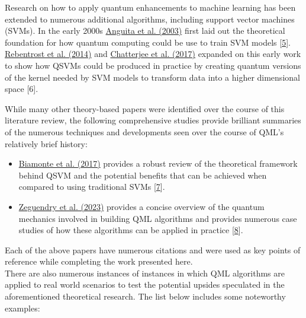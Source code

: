 \documentclass[11pt, oneside]{article}   	%
\begin{document}
\noindent\hspace{10mm}Research on how to apply quantum enhancements to machine learning has been extended to numerous additional algorithms, including support vector machines (SVMs). In the early 2000s \href{https://members.cbio.mines-paristech.fr/~jvert/svn/bibli/local/Anguita2003Quantum.pdf}{Anguita et al. (2003)} first laid out the theoretical foundation for how quantum computing could be use to train SVM models [\href{https://doi.org/10.1016/S0893-6080(03)00087-X}{5}]. \href{https://arxiv.org/abs/1307.0471}{Rebentrost et al. (2014)} and \href{https://doi.org/10.26421/QIC17.15-16}{Chatterjee et al. (2017)} expanded on this early work to show how QSVMs could be produced in practice by creating quantum versions of the kernel needed by SVM models to transform data into a higher dimensional space [6]. 

\noindent\hspace{10mm} While many other theory-based papers were identified over the course of this literature review, the following comprehensive studies provide brilliant summaries of the numerous techniques and developments seen over the course of QML's relatively brief history: 

\begin{itemize}

\item \href{https://doi.org/10.1038/nature23474}{Biamonte et al. (2017)} provides a robust review of the theoretical framework behind QSVM and the potential benefits that can be achieved when compared to using traditional SVMs [\href{https://doi.org/10.1038/nature23474}{7}]. 
\item \href{https://pubmed.ncbi.nlm.nih.gov/36832654/}{Zeguendry et al. (2023)} provides a concise overview of the quantum mechanics involved in building QML algorithms and provides numerous case studies of how these algorithms can be applied in practice [\href{https://doi.org/10.3390/e25020287}{8}]. 


\end{itemize}

\noindent\hspace{10mm}Each of the above papers have numerous citations and were used as key points of reference while completing the work presented here. \\

\noindent\hspace{10mm}There are also numerous instances of instances in which QML algorithms are applied to real world scenarios to test the potential upsides speculated in the aforementioned theoretical research. The list below includes some noteworthy examples: 
\end{document}
